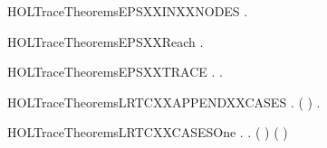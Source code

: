 \newcommand{\HOLTraceTheoremsEPSXXANDXXTRACE}{\UseVerbatim{HOLTraceTheoremsEPSXXANDXXTRACE}}
\begin{SaveVerbatim}{HOLTraceTheoremsEPSXXINXXNODES}
\HOLTokenTurnstile{} \HOLSymConst{\HOLTokenForall{}} .    \HOLSymConst{\HOLTokenImp{}}  \HOLConst{\HOLTokenIn{}}  
\end{SaveVerbatim}
\newcommand{\HOLTraceTheoremsEPSXXINXXNODES}{\UseVerbatim{HOLTraceTheoremsEPSXXINXXNODES}}
\begin{SaveVerbatim}{HOLTraceTheoremsEPSXXReach}
\HOLTokenTurnstile{} \HOLSymConst{\HOLTokenForall{}} .    \HOLSymConst{\HOLTokenImp{}}   
\end{SaveVerbatim}
\newcommand{\HOLTraceTheoremsEPSXXReach}{\UseVerbatim{HOLTraceTheoremsEPSXXReach}}
\begin{SaveVerbatim}{HOLTraceTheoremsEPSXXTRACE}
\HOLTokenTurnstile{} \HOLSymConst{\HOLTokenForall{}} .    \HOLSymConst{\HOLTokenImp{}} \HOLSymConst{\HOLTokenExists{}}.    
\end{SaveVerbatim}
\newcommand{\HOLTraceTheoremsEPSXXTRACE}{\UseVerbatim{HOLTraceTheoremsEPSXXTRACE}}
\begin{SaveVerbatim}{HOLTraceTheoremsLRTCXXAPPENDXXCASES}
\HOLTokenTurnstile{} \HOLSymConst{\HOLTokenForall{}}    .
          ( \HOLSymConst{++} )  \HOLSymConst{\HOLTokenEquiv{}}
       \HOLSymConst{\HOLTokenExists{}}.      \HOLSymConst{\HOLTokenConj{}}     
\end{SaveVerbatim}
\newcommand{\HOLTraceTheoremsLRTCXXAPPENDXXCASES}{\UseVerbatim{HOLTraceTheoremsLRTCXXAPPENDXXCASES}}
\begin{SaveVerbatim}{HOLTraceTheoremsLRTCXXCASESOne}
\HOLTokenTurnstile{} \HOLSymConst{\HOLTokenForall{}}   .
            \HOLSymConst{\HOLTokenEquiv{}}
            \HOLSymConst{=} 
        \HOLSymConst{\HOLTokenExists{}}.   ( )  \HOLSymConst{\HOLTokenConj{}}    ( ) 
\end{SaveVerbatim}
